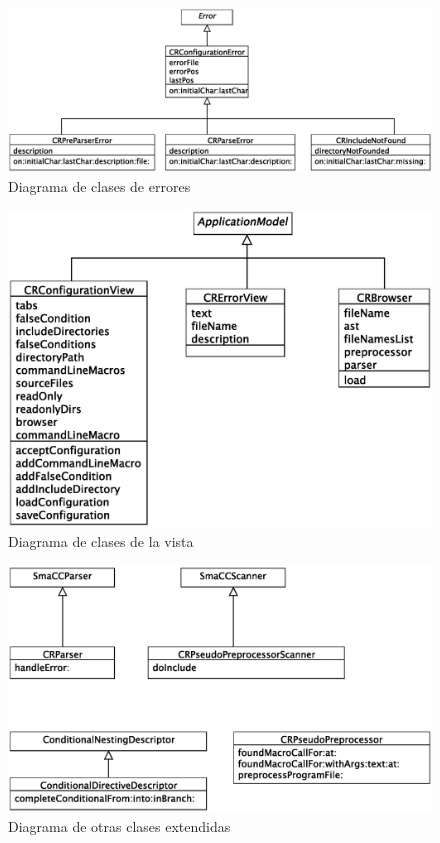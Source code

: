 \documentclass[a4paper,oneside,12pt]{article}
\begin{document}
\begin{figure}[h!]
  \centering
    \includegraphics[scale=0.50]{images/diagrama_clases_excepciones.eps}
    \caption{Diagrama de clases de errores}
    \label{diagrama_de_clases_excepciones}
\end{figure}

\begin{figure}[h!]
  \centering
    \includegraphics[scale=0.60]{images/diagrama_clases_vista.eps}
    \caption{Diagrama de clases de la vista}
    \label{diagrama_de_clases_vista}
\end{figure}

\begin{figure}[h!]
  \centering
    \includegraphics[scale=0.60]{images/diagrama_clases_extendidas.eps}
    \caption{Diagrama de otras clases extendidas}
    \label{diagrama_de_clases_extendidas}
\end{figure}
\end{document}
